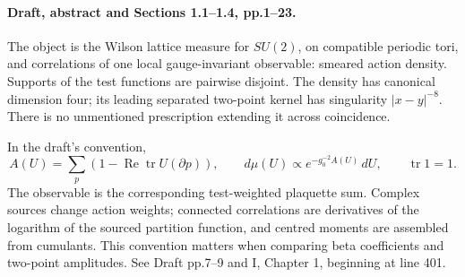 \documentclass[11pt]{article}
\theoremstyle{remark}
\begin{document}
\paragraph{Draft, abstract and Sections 1.1--1.4, pp.1--23.}
The object is the Wilson lattice measure for \(SU(2)\), on
compatible periodic tori, and correlations of one local
gauge-invariant observable: smeared action density.
Supports of the test functions are pairwise disjoint.
The density has canonical dimension four; its leading
separated two-point kernel has singularity \(|x-y|^{-8}\).
There is no unmentioned prescription extending it across
coincidence.

In the draft's convention,
\[
 A(U)=\sum_p(1-\operatorname{Re}\operatorname{tr}U(\partial p)),
 \qquad d\mu(U)\propto e^{-g_0^{-2}A(U)}\,dU,
 \qquad \operatorname{tr}1=1 .
\]
The observable is the corresponding test-weighted plaquette
sum. Complex sources change action weights; connected
correlations are derivatives of the logarithm of the
sourced partition function, and centred moments are
assembled from cumulants. This convention matters when
comparing beta coefficients and two-point amplitudes.
See Draft pp.7--9 and I, Chapter 1, beginning at line 401.
\end{document}
